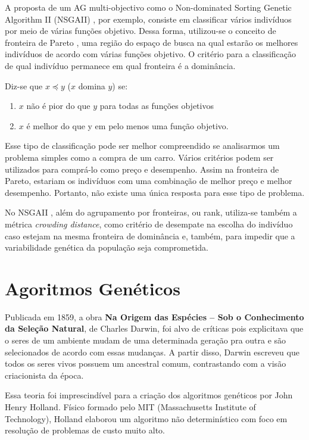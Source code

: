 \documentclass[]{article}
\begin{document}
	A proposta de um AG multi-objectivo como o Non-dominated Sorting Genetic Algorithm II (NSGAII) \cite{NSGAII}, por exemplo, consiste em classificar vários indivíduos por meio de várias funções objetivo. Dessa forma, utilizou-se o conceito de fronteira de Pareto  \cite{Pareto}, uma região do espaço de busca na qual estarão os melhores indivíduos de acordo com várias funções objetivo. O critério para a classificação de qual indivíduo permanece em qual fronteira é a dominância.
	
	Diz-se que $x \preceq y$ ($x$ domina $y$) se:
	
	\begin{enumerate}
		\item $x$ não é pior do que $y$ para todas as funções objetivos
		
		\item $x$ é melhor do que y em pelo menos uma função objetivo.
	\end{enumerate}
	
	Esse tipo de classificação pode ser melhor compreendido se analisarmos um problema simples como a compra de um carro. Vários critérios podem ser utilizados para comprá-lo como preço e desempenho. Assim na fronteira de Pareto, estariam os indivíduos com uma combinação de melhor preço e melhor desempenho. Portanto, não existe uma única resposta para esse tipo de problema.
	
	No  NSGAII \cite{NSGAII}, além do agrupamento por fronteiras, ou rank, utiliza-se também a métrica \textit{crowding distance}, como critério de desempate na escolha do indivíduo caso estejam na mesma fronteira de dominância e, também, para impedir que a variabilidade genética da população seja comprometida.
	 
	
\section{Agoritmos Genéticos}

	Publicada em 1859, a obra \textbf{Na Origem das Espécies – Sob o Conhecimento da Seleção Natural}, de Charles Darwin, foi alvo de críticas pois explicitava que o seres de um ambiente mudam de uma determinada geração pra outra e são selecionados de acordo com essas mudanças. A partir disso, Darwin escreveu que todos os seres vivos possuem um ancestral comum, contrastando com a visão criacionista da época.
	
	Essa teoria foi imprescindível para a criação dos algoritmos genéticos por John Henry Holland. Físico formado pelo MIT (Massachusetts Institute of Technology), Holland elaborou um algoritmo não determinístico com foco em resolução de problemas de custo muito alto.
	
\end{document}

